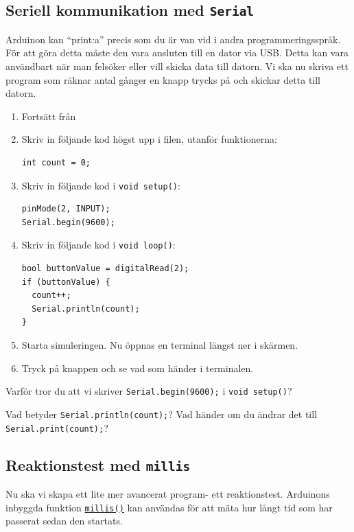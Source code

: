 \documentclass[11pt]{article}
\begin{document}
\newpage
\subsection{Seriell kommunikation med \texttt{Serial}}\label{sec:serial}
Arduinon kan ``print:a'' precis som du är van vid i andra programmeringsspråk.
För att göra detta måste den vara ansluten till en dator via USB. Detta kan
vara
användbart när man felsöker eller vill skicka data till datorn. Vi ska nu
skriva ett program som räknar antal gånger en knapp trycks på och skickar detta
till datorn.

\begin{enumerate}[itemsep=1em]
      \item
            Fortsätt från 
      \item Skriv in följande kod högst upp i filen, utanför funktionerna:
            \begin{lstlisting}
int count = 0;
            \end{lstlisting}
      \item Skriv in följande kod i \texttt{void setup()}:
            \begin{lstlisting}
pinMode(2, INPUT);
Serial.begin(9600);
            \end{lstlisting}
      \item Skriv in följande kod i \texttt{void loop()}:
            \begin{lstlisting}
bool buttonValue = digitalRead(2);
if (buttonValue) {
  count++;
  Serial.println(count);
}
            \end{lstlisting}
      \item Starta simuleringen. Nu öppnas en terminal längst ner i skärmen.
      \item Tryck på knappen och se vad som händer i terminalen.
\end{enumerate}
\vspace{1em}
Varför tror du att vi skriver \texttt{Serial.begin(9600);} i \texttt{void
      setup()}?

Vad betyder \texttt{Serial.println(count);}? Vad händer om du ändrar det till
\texttt{Serial.print(count);}?

\newpage
\subsection{Reaktionstest med \texttt{millis}}
Nu ska vi skapa ett lite mer avancerat program- ett reaktionstest.
Arduinons inbyggda funktion
\texttt{\href{https://www.arduino.cc/reference/en/language/functions/time/millis/}{millis()}}
kan användas för att mäta hur långt tid som har passerat sedan den startats.
\end{document}
